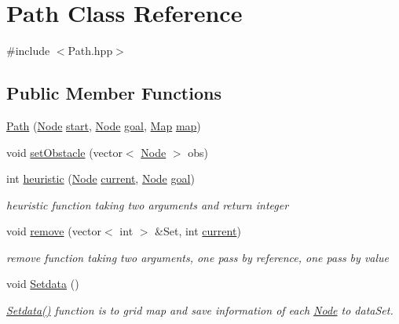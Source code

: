 \hypertarget{classPath}{}\section{Path Class Reference}
\label{classPath}


{\ttfamily \#include $<$Path.\+hpp$>$}

\subsection*{Public Member Functions}
\begin{DoxyCompactItemize}
\item 
\hyperlink{classPath_aa44674f9cfc08c9bcfa9dea22a32b613}{Path} (\hyperlink{classNode}{Node} \hyperlink{classPath_a82f8a235d983ef188f162bf650ef4a47}{start}, \hyperlink{classNode}{Node} \hyperlink{classPath_a84f44ef4fe5af14812dfcbc9f8625fc1}{goal}, \hyperlink{classMap}{Map} \hyperlink{classPath_ac69916a76b41530a848ceb3238b82441}{map})
\item 
void \hyperlink{classPath_a0487872dab008b8ebd27f23d27a52ca7}{set\+Obstacle} (vector$<$ \hyperlink{classNode}{Node} $>$ obs)
\item 
int \hyperlink{classPath_a41badb5baafeabe22b5c3dff132d25c6}{heuristic} (\hyperlink{classNode}{Node} \hyperlink{classPath_a3070eec5809bb39f9738b1025a9b567f}{current}, \hyperlink{classNode}{Node} \hyperlink{classPath_a84f44ef4fe5af14812dfcbc9f8625fc1}{goal})
\begin{DoxyCompactList}\small\item\em heuristic function taking two arguments and return integer \end{DoxyCompactList}\item 
void \hyperlink{classPath_a27e051fa22336b2b3fbac553dc16ea58}{remove} (vector$<$ int $>$ \&Set, int \hyperlink{classPath_a3070eec5809bb39f9738b1025a9b567f}{current})
\begin{DoxyCompactList}\small\item\em remove function taking two arguments, one pass by reference, one pass by value \end{DoxyCompactList}\item 
\mbox{\label{classPath_a46adcdba89032c765f282e74b998085f}} 
void \hyperlink{classPath_a46adcdba89032c765f282e74b998085f}{Setdata} ()
\begin{DoxyCompactList}\small\item\em \hyperlink{classPath_a46adcdba89032c765f282e74b998085f}{Setdata()} function is to grid map and save information of each \hyperlink{classNode}{Node} to data\+Set. \end{DoxyCompactList}\item 

\end{DoxyCompactItemize}
